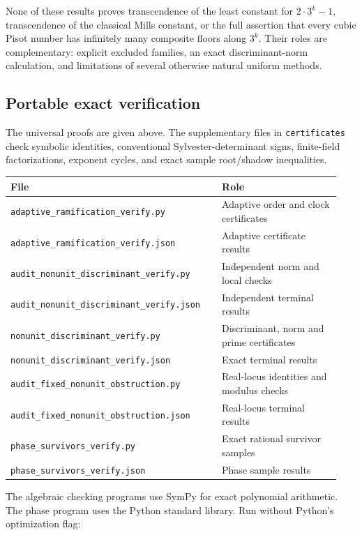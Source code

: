 \documentclass[11pt,a4paper]{article}
\theoremstyle{definition}\newtheorem{definition}[theorem]{Definition}
\theoremstyle{remark}\newtheorem{remark}[theorem]{Remark}
\begin{document}
None of these results proves transcendence of the least constant
for $2\cdot3^k-1$, transcendence of the classical Mills constant,
or the full assertion that every cubic Pisot number has infinitely
many composite floors along $3^k$. Their roles are complementary:
explicit excluded families, an exact discriminant-norm calculation,
and limitations of several otherwise natural uniform methods.


\subsection{Portable exact verification}

The universal proofs are given above. The supplementary files in
\texttt{certificates} check symbolic identities, conventional
Sylvester-determinant signs, finite-field factorizations, exponent
cycles, and exact sample root/shadow inequalities.
\begin{center}\small
\begin{tabular}{@{}p{0.60\linewidth}p{0.34\linewidth}@{}}
\toprule
File&Role\\\midrule
\texttt{adaptive\_ramification\_verify.py}&Adaptive order and clock certificates\\
\texttt{adaptive\_ramification\_verify.json}&Adaptive certificate results\\
\texttt{audit\_nonunit\_discriminant\_verify.py}&Independent norm and local checks\\
\texttt{audit\_nonunit\_discriminant\_verify.json}&Independent terminal results\\
\texttt{nonunit\_discriminant\_verify.py}&Discriminant, norm and prime certificates\\
\texttt{nonunit\_discriminant\_verify.json}&Exact terminal results\\
\texttt{audit\_fixed\_nonunit\_obstruction.py}&Real-locus identities and modulus checks\\
\texttt{audit\_fixed\_nonunit\_obstruction.json}&Real-locus terminal results\\
\texttt{phase\_survivors\_verify.py}&Exact rational survivor samples\\
\texttt{phase\_survivors\_verify.json}&Phase sample results\\
\bottomrule
\end{tabular}
\end{center}
The algebraic checking programs use SymPy for exact
polynomial arithmetic. The phase program uses the Python standard
library. Run without Python's optimization flag:
\end{document}
